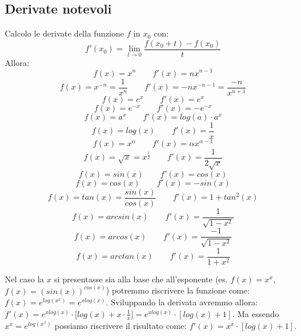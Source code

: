 \subsection{Derivate notevoli}
Calcolo le derivate della funzione $f$ in $x_0$ con:
\begin{equation}
    f'(x_0) = \lim_{t \to 0}\frac{f(x_0 + t)- f(x_0)}{t}
\end{equation}
Allora:
\begin{equation}
    f(x) = x^n \qquad f'(x) = nx^{n-1}
\end{equation}
\begin{equation}
    f(x) = x^{-n} = \frac{1}{x^n} \qquad f'(x) = -nx^{-n-1} = \frac{-n}{x^{n+1}}
\end{equation}
\begin{equation}
    f(x) = e^x \qquad f'(x) = e^x
\end{equation}
\begin{equation}
    f(x) = e^{-x} \qquad f'(x) = -e^{-x}
\end{equation}
\begin{equation}
    f(x) = a^x \qquad f'(x) = log(a) \cdot a^x
\end{equation}
\begin{equation}
    f(x) = log(x) \qquad f'(x) = \frac{1}{x}
\end{equation}
\begin{equation}
    f(x) = x^\alpha \qquad f'(x) = \alpha x^{\alpha - 1} 
\end{equation}
\begin{equation}
    f(x) = \sqrt{x} = x^\frac{1}{2} \qquad f'(x) = \frac{1}{2\sqrt{x}}
\end{equation}
\begin{equation}
    f(x) = sin(x) \qquad f'(x) = cos(x)
\end{equation}
\begin{equation}
    f(x) = cos(x) \qquad f'(x) = -sin(x)
\end{equation}
\begin{equation}
    f(x) = tan(x) = \frac{sin(x)}{cos(x)} \qquad f'(x) = 1 + tan^2(x)
\end{equation}
\begin{equation}
    f(x) = arcsin(x) \qquad f'(x) = \frac{1}{\sqrt{1-x^2}}
\end{equation}
\begin{equation}
    f(x) = arcos(x) \qquad f'(x) = \frac{-1}{\sqrt{1-x^2}}
\end{equation}
\begin{equation}
    f(x) = arctan(x) \qquad f'(x) = \frac{1}{1+x^2}
\end{equation}

Nel caso la $x$ si presentasse sia alla base che all'esponente (es. $f(x) = x^x$, $f(x) = (sin(x))^{cos(x)}$) potremmo riscrivere la funzione come:  $f(x) = e^{log(x^x)} = e^{xlog(x)}$.
Sviluppando la derivata avremmo allora: $f'(x) = e^{xlog(x)}\cdot \Big[log(x) + x\cdot\frac{1}{x}\Big] = e^{xlog(x)}\cdot [log(x) + 1]$. Ma essendo $x^x = e^{log(x^x)}$ possiamo riscrivere il risultato come: $f'(x) = x^x \cdot [log(x)+1]$.